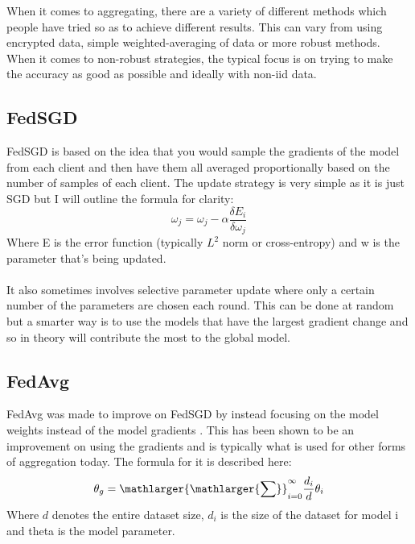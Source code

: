 When it comes to aggregating, there are a variety of different methods which people have tried so as to achieve different results.
This can vary from using encrypted data, simple weighted-averaging of data or more robust methods.
When it comes to non-robust strategies, the typical focus is on trying to make the accuracy as good as possible and ideally with non-iid data.


\subsection{FedSGD}
FedSGD is based on the idea that you would sample the gradients of the model from each client and then have them all averaged proportionally based on the number of samples of each client.
The update strategy is very simple as it is just SGD but I will outline the formula for clarity:
\begin{equation}
    \omega_j = \omega_j - \alpha \dfrac{\delta E_i}{\delta \omega_j}
\end{equation}
Where E is the error function (typically $L^2$ norm or cross-entropy) and w is the parameter that's being updated.
\\ \\
It also sometimes involves selective parameter update where only a certain number of the parameters are chosen each round.
This can be done at random but a smarter way is to use the models that have the largest gradient change and so in theory will contribute the most to the global model.


\subsection{FedAvg}
FedAvg was made to improve on FedSGD by instead focusing on the model weights instead of the model gradients \cite[section 2.1]{robagg_health}.
This has been shown to be an improvement on using the gradients and is typically what is used for other forms of aggregation today.
The formula for it is described here:
\begin{equation}
    \theta_g = \mathlarger{\mathlarger{\sum}}_{i=0}^{\infty} \dfrac{d_i}{d} \theta_i
\end{equation}
Where $d$ denotes the entire dataset size, $d_i$ is the size of the dataset for model i and theta is the model parameter.


